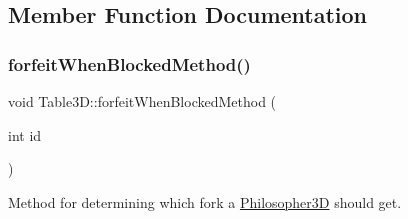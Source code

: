 \subsection{Member Function Documentation}
\mbox{\label{class_table3_d_abcbe27c7295a6ca53d8a6e479c3a258d}} 
\subsubsection{\texorpdfstring{forfeit\+When\+Blocked\+Method()}{forfeitWhenBlockedMethod()}}
{\footnotesize\ttfamily void Table3\+D\+::forfeit\+When\+Blocked\+Method (\begin{DoxyParamCaption}\item[{int}]{id }\end{DoxyParamCaption})}



Method for determining which fork a \hyperlink{class_philosopher3_d}{Philosopher3D} should get. 


